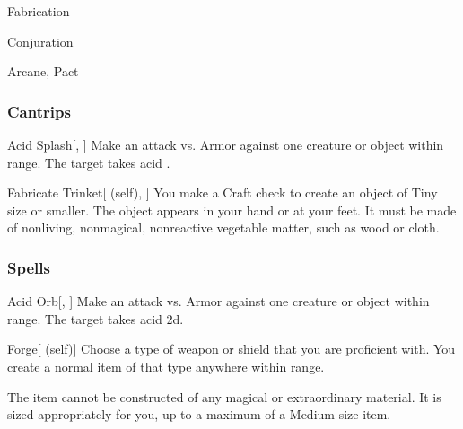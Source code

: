 \newpage
\begin{spellsection}{Fabrication}

\begin{spellheader}
\end{spellheader}


 Conjuration

 Arcane, Pact

\subsubsection{Cantrips}


\begin{freeability}{Acid Splash}[, ]
Make an attack vs. Armor against one creature or object within \rngmed range.
\hit The target takes acid .
\end{freeability}


\begin{attuneability}{Fabricate Trinket}[ (self), ]
You make a Craft check to create an object of Tiny size or smaller.
The object appears in your hand or at your feet.
It must be made of nonliving, nonmagical, nonreactive vegetable matter, such as wood or cloth.
\end{attuneability}

\end{spellsection}


\subsubsection{Spells}


\lowercase{\hypertarget{spell:Acid Orb}{}}\label{spell:Acid Orb}
\begin{apability}[\nth{1}]{\hypertarget{spell:Acid Orb}{Acid Orb}}[, ]
Make an attack vs. Armor against one creature or object within \rngmed range.
\hit The target takes acid  \plus2d.
\end{apability}
\vspace{0.25em}



\lowercase{\hypertarget{spell:Forge}{}}\label{spell:Forge}
\begin{attuneability}[\nth{1}]{\hypertarget{spell:Forge}{Forge}}[ (self)]
Choose a type of weapon or shield that you are proficient with.
You create a normal item of that type anywhere within \rngclose range.

The item cannot be constructed of any magical or extraordinary material.
It is sized appropriately for you, up to a maximum of a Medium size item.
\end{attuneability}
\vspace{0.25em}



